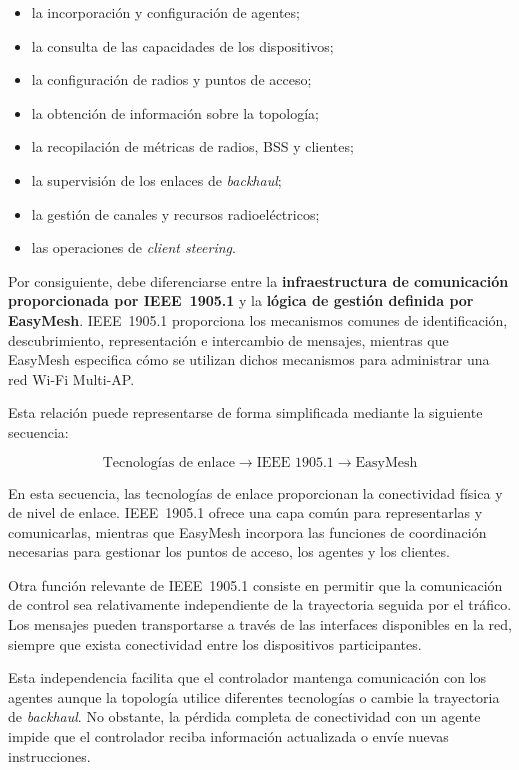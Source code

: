 \begin{itemize}
    \item la incorporación y configuración de agentes;
    \item la consulta de las capacidades de los dispositivos;
    \item la configuración de radios y puntos de acceso;
    \item la obtención de información sobre la topología;
    \item la recopilación de métricas de radios, BSS y clientes;
    \item la supervisión de los enlaces de \textit{backhaul};
    \item la gestión de canales y recursos radioeléctricos;
    \item las operaciones de \textit{client steering}.
\end{itemize}

Por consiguiente, debe diferenciarse entre la
\textbf{infraestructura de comunicación proporcionada por IEEE~1905.1}
y la \textbf{lógica de gestión definida por EasyMesh}. IEEE~1905.1
proporciona los mecanismos comunes de identificación, descubrimiento,
representación e intercambio de mensajes, mientras que EasyMesh
especifica cómo se utilizan dichos mecanismos para administrar una red
Wi-Fi Multi-AP.

Esta relación puede representarse de forma simplificada mediante la
siguiente secuencia:

\[
    \text{Tecnologías de enlace}
    \longrightarrow
    \text{IEEE~1905.1}
    \longrightarrow
    \text{EasyMesh}
\]

En esta secuencia, las tecnologías de enlace proporcionan la conectividad
física y de nivel de enlace. IEEE~1905.1 ofrece una capa común para
representarlas y comunicarlas, mientras que EasyMesh incorpora las
funciones de coordinación necesarias para gestionar los puntos de acceso,
los agentes y los clientes.

Otra función relevante de IEEE~1905.1 consiste en permitir que la
comunicación de control sea relativamente independiente de la trayectoria
seguida por el tráfico. Los mensajes pueden transportarse a través de las
interfaces disponibles en la red, siempre que exista conectividad entre
los dispositivos participantes.

Esta independencia facilita que el controlador mantenga comunicación con
los agentes aunque la topología utilice diferentes tecnologías o cambie
la trayectoria de \textit{backhaul}. No obstante, la pérdida completa de
conectividad con un agente impide que el controlador reciba información
actualizada o envíe nuevas instrucciones.

